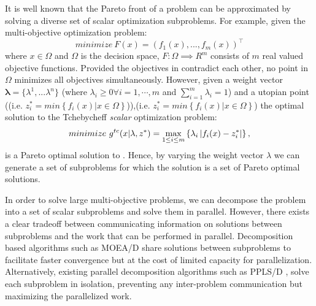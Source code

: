 It is well known that the Pareto front of a problem can be approximated by solving a diverse set of scalar optimization subproblems. For example, given the multi-objective optimization problem:
\begin{equation}
    minimize\ F(x) = (f_1(x), ..., f_m(x))^\intercal
    \label{eq:mop}
\end{equation}
where $x \in \Omega$ and $\Omega$ is the decision space, $F: \Omega \implies R^m$ consists of $m$ real valued objective functions. Provided the objectives in  contradict each other, no point in $\Omega$ minimizes all objectives simultaneously. However, given a weight vector $\mathbf{\lambda} = \{\lambda^1, ... \lambda^n\}$ (where $\lambda_i \geq 0 \forall i = 1,\cdots,m$ and $\sum_{i=1}^m \lambda_i = 1$) and a utopian point ((i.e. $z_i^* = min \left\{f_i(x) | x \in \Omega \right\}$)),(i.e. $z_i^* = min \left\{f_i(x) | x \in \Omega \right\}$) the optimal solution to the Tchebycheff \textit{scalar} optimization problem:
\begin{equation}
    minimize\ g^{tc}(x | \lambda, z^*) = \max_{1 \leq i \leq m} \left\{\lambda_i \left\lvert f_i(x) - z_i^* \right\rvert \right\},
    \label{eq:tchebycheff}
\end{equation}
is a Pareto optimal solution to . Hence, by varying the weight vector $\lambda$ we can generate a set of subproblems for which the solution is a set of Pareto optimal solutions. 

In order to solve large multi-objective problems, we can decompose the problem into a set of scalar subproblems and solve them in parallel. However, there exists a clear tradeoff between communicating information on solutions between subproblems and the work that can be performed in parallel. Decomposition based algorithms such as MOEA/D share solutions between subproblems to facilitate faster convergence but at the cost of limited capacity for parallelization. Alternatively, existing parallel decomposition algorithms such as PPLS/D \cite{ShiZS20}, solve each subproblem in isolation, preventing any inter-problem communication but maximizing the parallelized work.

